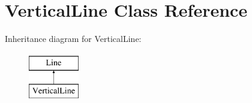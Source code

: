 \hypertarget{classVerticalLine}{\section{\-Vertical\-Line \-Class \-Reference}
\label{classVerticalLine}
}
\-Inheritance diagram for \-Vertical\-Line\-:\begin{figure}[H]
\begin{center}
\leavevmode
\includegraphics[height=2.000000cm]{classVerticalLine}
\end{center}
\end{figure}
